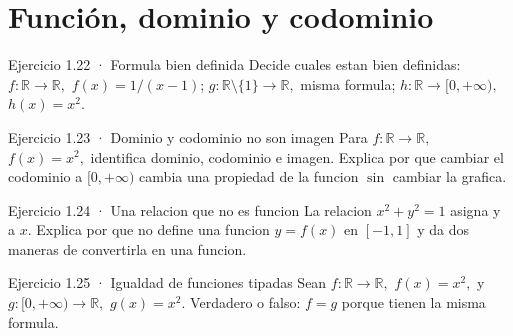 \documentclass[10pt,a4paper,oneside,openany]{book}
\begin{document}
\section{Función, dominio y codominio}
\begin{PSevenExerciseFixed}{Ejercicio 1.22 · Formula bien definida}
Decide cuales estan bien definidas: \(f:\mathbb{R}\to \mathbb{R},\) \(f(x)=1/(x-1)\); \(g:\mathbb{R}\setminus \{1\}\to \mathbb{R},\) misma formula; \(h:\mathbb{R}\to [0,+\infty ),\) \(h(x)=x^{2}\).
\end{PSevenExerciseFixed}
\begin{PSevenExerciseFixed}{Ejercicio 1.23 · Dominio y codominio no son imagen}
Para \(f:\mathbb{R}\to \mathbb{R},\) \(f(x)=x^{2},\) identifica dominio, codominio e imagen. Explica por que cambiar el codominio a \([0,+\infty )\) cambia una propiedad de la funcion \(\sin\) cambiar la grafica.
\end{PSevenExerciseFixed}
\begin{PSevenExerciseFixed}{Ejercicio 1.24 · Una relacion que no es funcion}
La relacion \(x^{2}+y^{2}=1\) asigna y a \(x\). Explica por que no define una funcion \(y=f(x)\) en \([-1,1]\) y da dos maneras de convertirla en una funcion.
\end{PSevenExerciseFixed}
\begin{PSevenExerciseFixed}{Ejercicio 1.25 · Igualdad de funciones tipadas}
Sean \(f:\mathbb{R}\to \mathbb{R},\) \(f(x)=x^{2},\) y \(g:[0,+\infty )\to \mathbb{R},\) \(g(x)=x^{2}\). Verdadero o falso: \(f=g\) porque tienen la misma formula.
\end{PSevenExerciseFixed}
\end{document}
